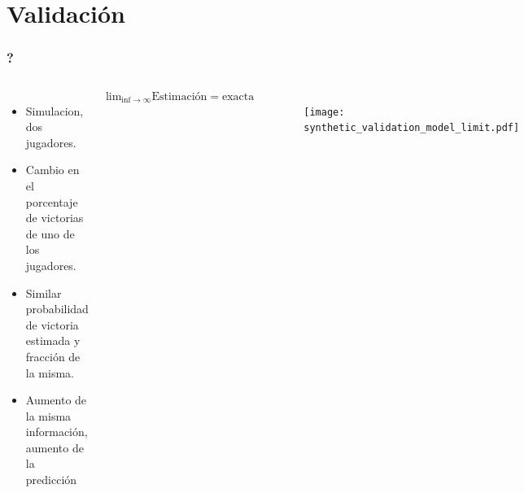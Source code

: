 \documentclass{beamer}
\begin{document}
\section{Validaci\'on}
\begin{frame}
\frametitle{?}

\begin{columns}
 
 \begin{itemize}
\item Simulacion, dos jugadores.
\item Cambio en el porcentaje de victorias de uno de los jugadores.
 \item Similar probabilidad de victoria estimada y fracci\'on de la misma.
\item Aumento de la misma informaci\'on, aumento de la predicci\'on
\end{itemize}

\begin{equation*}
    \text{lim}_{\text{inf}\rightarrow \infty} \text{Estimaci\'on} = \text{exacta}
\end{equation*}

 
  \begin{figure}[H]
	\centering
	\texttt{[image: synthetic\_validation\_model\_limit.pdf]}
\end{figure}
\end{columns}

\end{frame}
\end{document}
